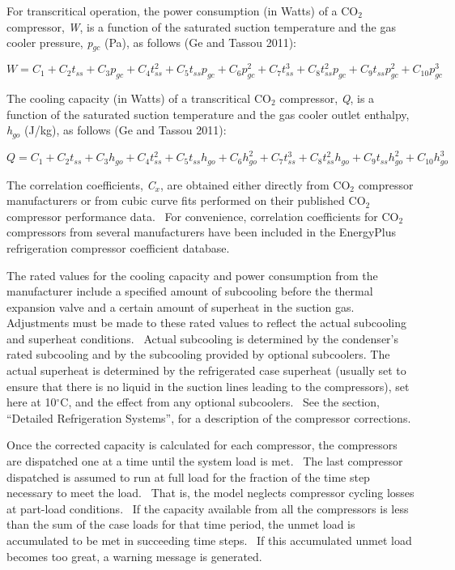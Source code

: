 For transcritical operation, the power consumption (in Watts) of a CO\(_{2}\) compressor, \emph{W}, is a function of the saturated suction temperature and the gas cooler pressure, \emph{p\(_{gc}\)} (Pa), as follows (Ge and Tassou 2011):

\begin{equation}
W = {C_1} + {C_2}{t_{ss}} + {C_3}{p_{gc}} + {C_4}t_{ss}^2 + {C_5}{t_{ss}}{p_{gc}} + {C_6}p_{gc}^2 + {C_7}t_{ss}^3 + {C_8}t_{ss}^2{p_{gc}} + {C_9}{t_{ss}}p_{gc}^2 + {C_{10}}p_{gc}^3
\end{equation}

The cooling capacity (in Watts) of a transcritical CO\(_{2}\) compressor, \emph{Q}, is a function of the saturated suction temperature and the gas cooler outlet enthalpy, \emph{h\(_{go}\)} (J/kg), as follows (Ge and Tassou 2011):

\begin{equation}
Q = {C_1} + {C_2}{t_{ss}} + {C_3}{h_{go}} + {C_4}t_{ss}^2 + {C_5}{t_{ss}}{h_{go}} + {C_6}h_{go}^2 + {C_7}t_{ss}^3 + {C_8}t_{ss}^2{h_{go}} + {C_9}{t_{ss}}h_{go}^2 + {C_{10}}h_{go}^3
\end{equation}

The correlation coefficients, \emph{C\(_{x}\)}, are obtained either directly from CO\(_{2}\) compressor manufacturers or from cubic curve fits performed on their published CO\(_{2}\) compressor performance data.~ For convenience, correlation coefficients for CO\(_{2}\) compressors from several manufacturers have been included in the EnergyPlus refrigeration compressor coefficient database.

The rated values for the cooling capacity and power consumption from the manufacturer include a specified amount of subcooling before the thermal expansion valve and a certain amount of superheat in the suction gas.~ Adjustments must be made to these rated values to reflect the actual subcooling and superheat conditions.~ Actual subcooling is determined by the condenser's rated subcooling and by the subcooling provided by optional subcoolers. The actual superheat is determined by the refrigerated case superheat (usually set to ensure that there is no liquid in the suction lines leading to the compressors), set here at 10\(^{\circ}\)C, and the effect from any optional subcoolers.~ See the section, ``Detailed Refrigeration Systems'', for a description of the compressor corrections.

Once the corrected capacity is calculated for each compressor, the compressors are dispatched one at a time until the system load is met.~ The last compressor dispatched is assumed to run at full load for the fraction of the time step necessary to meet the load.~ That is, the model neglects compressor cycling losses at part-load conditions.~ If the capacity available from all the compressors is less than the sum of the case loads for that time period, the unmet load is accumulated to be met in succeeding time steps.~ If this accumulated unmet load becomes too great, a warning message is generated.

